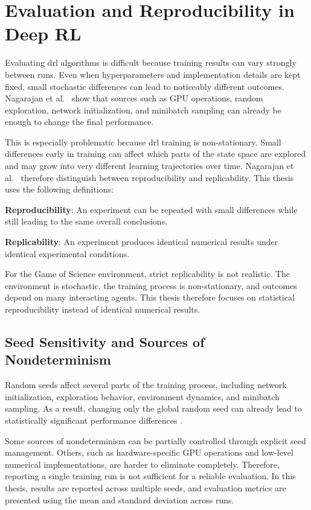 \documentclass[english,bachelor]{hsluthesis}
\begin{document}
\section{Evaluation and Reproducibility in Deep RL}

Evaluating \gls{drl} algorithms is difficult because training results can vary strongly between runs. Even when hyperparameters and implementation details are kept fixed, small stochastic differences can lead to noticeably different outcomes. Nagarajan et al.~\cite{Nagarajan2018TheIO} show that sources such as GPU operations, random exploration, network initialization, and minibatch sampling can already be enough to change the final performance.

This is especially problematic because \gls{drl} training is non-stationary. Small differences early in training can affect which parts of the state space are explored and may grow into very different learning trajectories over time. Nagarajan et al.~\cite{Nagarajan2018TheIO} therefore distinguish between reproducibility and replicability. This thesis uses the following definitions:

\textbf{Reproducibility}: An experiment can be repeated with small differences while still leading to the same overall conclusions.

\textbf{Replicability}: An experiment produces identical numerical results under identical experimental conditions.

For the Game of Science environment, strict replicability is not realistic. The environment is stochastic, the training process is non-stationary, and outcomes depend on many interacting agents. This thesis therefore focuses on statistical reproducibility instead of identical numerical results.

\subsection{Seed Sensitivity and Sources of Nondeterminism}

Random seeds affect several parts of the training process, including network initialization, exploration behavior, environment dynamics, and minibatch sampling. As a result, changing only the global random seed can already lead to statistically significant performance differences \cite{Nagarajan2018TheIO}.

Some sources of nondeterminism can be partially controlled through explicit seed management. Others, such as hardware-specific GPU operations and low-level numerical implementations, are harder to eliminate completely. Therefore, reporting a single training run is not sufficient for a reliable evaluation. In this thesis, results are reported across multiple seeds, and evaluation metrics are presented using the mean and standard deviation across runs.
\end{document}
